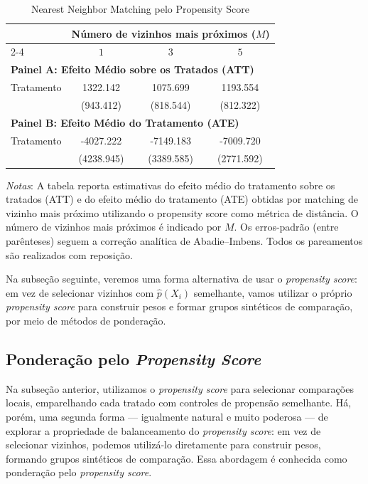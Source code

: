 \begin{table}[htbp]
\centering
\caption{Nearest Neighbor Matching pelo Propensity Score}
\label{tab:nn_pscore_trimmed}
\begin{tabular}{lccc}
\toprule
 & \multicolumn{3}{c}{Número de vizinhos mais próximos ($M$)} \\
\cmidrule(lr){2-4}
 & $1$ & $3$ & $5$ \\
\midrule
\multicolumn{4}{l}{\textbf{Painel A: Efeito Médio sobre os Tratados (ATT)}} \\
\midrule
Tratamento 
& 1322.142 
& 1075.699 
& 1193.554 \\
 
& (943.412) 
& (818.544) 
& (812.322) \\
\midrule
\multicolumn{4}{l}{\textbf{Painel B: Efeito Médio do Tratamento (ATE)}} \\
\midrule
Tratamento 
& -4027.222 
& -7149.183 
& -7009.720 \\
 
& (4238.945) 
& (3389.585) 
& (2771.592) \\
\bottomrule
\end{tabular}

\begin{flushleft}
\footnotesize
\textit{Notas}: A tabela reporta estimativas do efeito médio do tratamento sobre os tratados (ATT) e do efeito médio do tratamento (ATE) obtidas por matching de vizinho mais próximo utilizando o propensity score como métrica de distância. O número de vizinhos mais próximos é indicado por $M$. Os erros-padrão (entre parênteses) seguem a correção analítica de Abadie--Imbens. Todos os pareamentos são realizados com reposição.
\end{flushleft}\label{nnps}
\end{table}


Na subseção seguinte, veremos uma forma alternativa de usar o \textit{propensity score}: em vez de selecionar vizinhos com $\hat{p}(X_i)$ semelhante, vamos utilizar o próprio \textit{propensity score} para construir pesos e formar grupos sintéticos de comparação, por meio de métodos de ponderação.

\subsection{Ponderação pelo \textit{Propensity Score}}

Na subseção anterior, utilizamos o \textit{propensity score} para selecionar comparações locais, emparelhando cada tratado com controles de propensão semelhante. Há, porém, uma segunda forma — igualmente natural e muito poderosa — de explorar a propriedade de balanceamento do \textit{propensity score}: em vez de selecionar vizinhos, podemos utilizá-lo diretamente para construir pesos, formando grupos sintéticos de comparação. Essa abordagem é conhecida como ponderação pelo \textit{propensity score}.


